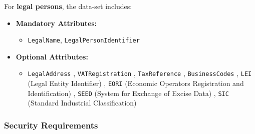 For \textbf{legal persons}, the data-set includes:
\begin{itemize}
    \item \textbf{Mandatory Attributes:}
    \begin{itemize}
        \item \texttt{LegalName}, \texttt{LegalPersonIdentifier}
    \end{itemize}
    \item \textbf{Optional Attributes:}
    \begin{itemize}
        \item \texttt{LegalAddress} , \texttt{VATRegistration} ,
          \texttt{TaxReference} , \texttt{BusinessCodes} ,
          \texttt{LEI} (Legal Entity Identifier) , \texttt{EORI}
          (Economic Operators Registration and Identification) ,
          \texttt{SEED} (System for Exchange of Excise Data) ,
          \texttt{SIC} (Standard Industrial Classification)
    \end{itemize}
\end{itemize}

\subsubsection{Security Requirements}

